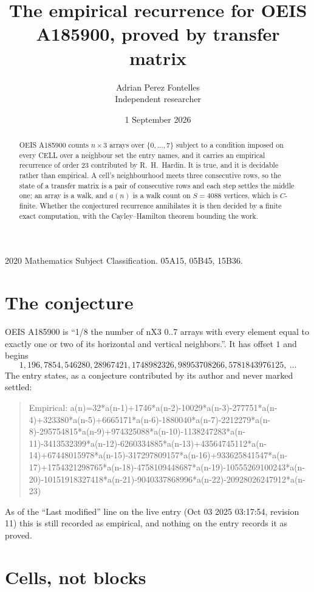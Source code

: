 \documentclass[11pt,a4paper]{article}
\title{The empirical recurrence for OEIS A185900, proved by transfer matrix}
\author{Adrian Perez Fontelles\\ \small Independent researcher}
\date{1 September 2026}
\theoremstyle{plain}
\theoremstyle{definition}
\begin{document}
\maketitle

\begin{abstract}
OEIS A185900 counts $n\times3$ arrays over $\{0,\dots,7\}$ subject to a condition imposed on
every CELL over a neighbour set the entry names, and it carries an empirical recurrence of
order $23$ contributed by R.~H.~Hardin. It is true, and it is decidable rather than
empirical. A cell's neighbourhood meets three consecutive rows, so the state of a transfer
matrix is a pair of consecutive rows and each step settles the middle one; an array is a
walk, and $a(n)$ is a walk count on $S=4088$ vertices, which is $C$-finite. Whether the
conjectured recurrence annihilates it is then decided by a finite exact computation, with the
Cayley--Hamilton theorem bounding the work.
\end{abstract}

\noindent\small 2020 Mathematics Subject Classification. 05A15, 05B45, 15B36.\normalsize

\section{The conjecture}

OEIS A185900 is ``1/8 the number of nX3 0..7 arrays with every element equal to exactly one or two of its horizontal and vertical neighbors.''. It has offset $1$ and begins
\[
1, 196, 7854, 546280, 28967421, 1748982326, 98953708266, 5781843976125,\ \dots
\]
The entry states, as a conjecture contributed by its author and never marked settled:
\begin{quote}
Empirical: a(n)=32*a(n-1)+1746*a(n-2)-10029*a(n-3)-277751*a(n-4)+323380*a(n-5)+6665171*a(n-6)-1880040*a(n-7)-2212279*a(n-8)-295754815*a(n-9)+974325088*a(n-10)-1138247283*a(n-11)-3413532399*a(n-12)-6260334885*a(n-13)+43564745112*a(n-14)+67448015978*a(n-15)-317297809157*a(n-16)+933625841547*a(n-17)+1754321298765*a(n-18)-4758109448687*a(n-19)-10555269100243*a(n-20)-10151918327418*a(n-21)-9040337868996*a(n-22)-20928026247912*a(n-23)
\end{quote}
As of the ``Last modified'' line on the live entry (Oct 03 2025 03:17:54, revision 11) this is still
recorded as empirical, and nothing on the entry records it as proved.

\section{Cells, not blocks}
\end{document}
